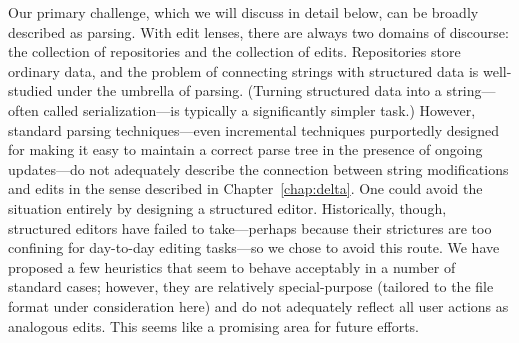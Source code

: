 Our primary challenge, which we will discuss in detail below, can be broadly
described as parsing. With edit lenses, there are always two domains of
discourse: the collection of repositories and the collection of edits.
Repositories store ordinary data, and the problem of connecting strings with
structured data is well-studied under the umbrella of parsing. (Turning
structured data into a string---often called serialization---is typically a
significantly simpler task.) However, standard parsing techniques---even
incremental techniques purportedly designed for making it easy to maintain a
correct parse tree in the presence of ongoing updates---do not adequately
describe the connection between string modifications and edits in the sense
described in Chapter~\ref{chap:delta}. One could avoid the situation
entirely by designing a structured editor. Historically, though, structured
editors have failed to take---perhaps because their strictures are too
confining for day-to-day editing tasks---so we chose to avoid this route. We
have proposed a few heuristics that seem to behave acceptably in a number of
standard cases; however, they are relatively special-purpose (tailored to
the file format under consideration here) and do not adequately reflect all
user actions as analogous edits. This seems like a promising area for future
efforts.

